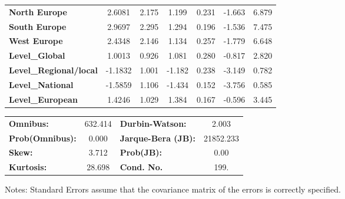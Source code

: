 \documentclass[ 11pt]{article}
\begin{document}
\begin{center}
\begin{tabular}{lcccccc}
\textbf{North Europe}          &       2.6081  &        2.175     &     1.199  &         0.231        &       -1.663    &        6.879     \\
\textbf{South Europe}          &       2.9697  &        2.295     &     1.294  &         0.196        &       -1.536    &        7.475     \\
\textbf{West Europe}           &       2.4348  &        2.146     &     1.134  &         0.257        &       -1.779    &        6.648     \\
\textbf{Level\_Global}         &       1.0013  &        0.926     &     1.081  &         0.280        &       -0.817    &        2.820     \\
\textbf{Level\_Regional/local} &      -1.1832  &        1.001     &    -1.182  &         0.238        &       -3.149    &        0.782     \\
\textbf{Level\_National}       &      -1.5859  &        1.106     &    -1.434  &         0.152        &       -3.756    &        0.585     \\
\textbf{Level\_European}       &       1.4246  &        1.029     &     1.384  &         0.167        &       -0.596    &        3.445     \\
\bottomrule
\end{tabular}
\begin{tabular}{lclc}
\textbf{Omnibus:}       & 632.414 & \textbf{  Durbin-Watson:     } &     2.003  \\
\textbf{Prob(Omnibus):} &   0.000 & \textbf{  Jarque-Bera (JB):  } & 21852.233  \\
\textbf{Skew:}          &   3.712 & \textbf{  Prob(JB):          } &      0.00  \\
\textbf{Kurtosis:}      &  28.698 & \textbf{  Cond. No.          } &      199.  \\
\bottomrule
\end{tabular}
\end{center}

Notes: \newline
 [1] Standard Errors assume that the covariance matrix of the errors is correctly specified.
 
\end{document}
